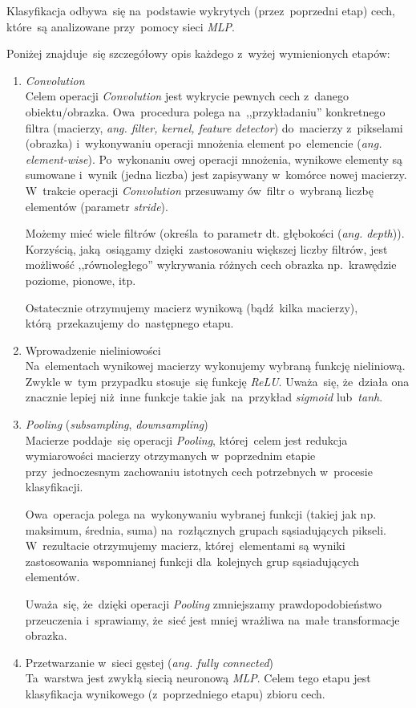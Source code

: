 \documentclass[11pt, a4paper]{article}
\begin{document}
Klasyfikacja odbywa~się na~podstawie wykrytych (przez~poprzedni etap) cech, które~są analizowane przy~pomocy sieci \textit{MLP}.

Poniżej znajduje~się szczegółowy opis każdego z~wyżej wymienionych etapów:
\begin{enumerate}
    \item \textit{Convolution} \\
    Celem operacji \textit{Convolution} jest wykrycie pewnych cech z~danego obiektu/obrazka. Owa~procedura polega na~,,przykładaniu'' konkretnego filtra (macierzy, \textit{ang. filter, kernel, feature detector}) do~macierzy z~pikselami (obrazka) i~wykonywaniu operacji mnożenia element po~elemencie (\textit{ang. element-wise}). Po~wykonaniu owej operacji mnożenia, wynikowe elementy są sumowane i~wynik (jedna liczba) jest zapisywany w~komórce nowej macierzy. W~trakcie operacji \textit{Convolution} przesuwamy ów~filtr o~wybraną liczbę elementów (parametr \textit{stride}).
    
    Możemy mieć wiele filtrów (określa~to parametr dt. głębokości (\textit{ang. depth})). Korzyścią, jaką~osiągamy dzięki~zastosowaniu większej liczby filtrów, jest możliwość ,,równoległego'' wykrywania różnych  cech obrazka np.~krawędzie poziome, pionowe, itp.
    
    Ostatecznie otrzymujemy macierz wynikową (bądź~kilka macierzy), którą~przekazujemy do~następnego etapu.
    
    \item Wprowadzenie nieliniowości \\
Na~elementach wynikowej macierzy wykonujemy wybraną funkcję nieliniową. Zwykle w~tym przypadku stosuje~się funkcję \textit{ReLU}. Uważa~się, że~działa ona znacznie lepiej niż~inne funkcje takie jak~na~przykład \textit{sigmoid} lub~\textit{tanh}.

\item \textit{Pooling} (\textit{subsampling}, \textit{downsampling}) \\
Macierze poddaje~się operacji \textit{Pooling}, której~celem jest redukcja wymiarowości macierzy otrzymanych w~poprzednim etapie przy~jednoczesnym zachowaniu istotnych cech potrzebnych w~procesie klasyfikacji.

Owa~operacja polega na~wykonywaniu wybranej funkcji (takiej jak np. maksimum, średnia, suma) na~rozłącznych grupach sąsiadujących pikseli. W~rezultacie otrzymujemy macierz, której~elementami są wyniki zastosowania wspomnianej funkcji dla~kolejnych grup sąsiadujących elementów.

Uważa~się, że~dzięki operacji \textit{Pooling} zmniejszamy prawdopodobieństwo przeuczenia i~sprawiamy, że~sieć jest mniej wrażliwa na~małe transformacje obrazka.

\item Przetwarzanie w~sieci gęstej (\textit{ang. fully connected}) \\
Ta~warstwa jest zwykłą siecią neuronową \textit{MLP}. Celem tego etapu jest klasyfikacja wynikowego (z~poprzedniego etapu) zbioru cech.

\end{enumerate}
\end{document}
